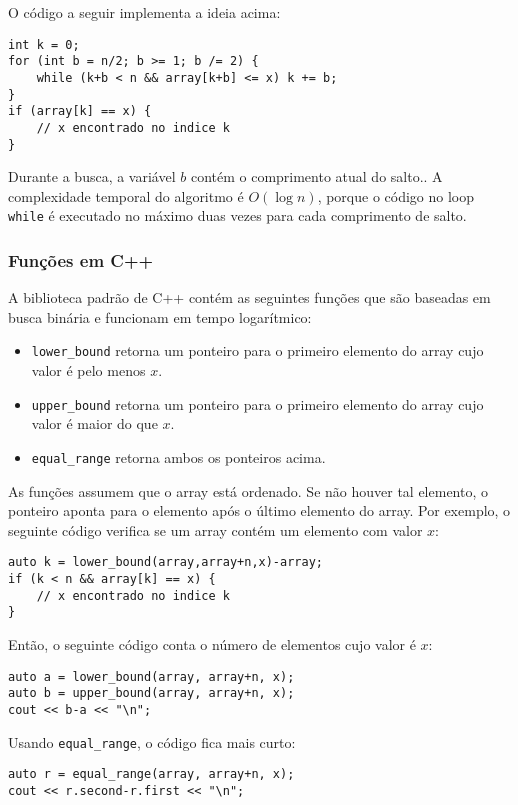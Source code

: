 O código a seguir implementa a ideia acima:
\begin{lstlisting}
int k = 0;
for (int b = n/2; b >= 1; b /= 2) {
    while (k+b < n && array[k+b] <= x) k += b;
}
if (array[k] == x) {
    // x encontrado no indice k
}
\end{lstlisting}

Durante a busca, a variável $b$
contém o comprimento atual do salto..
A complexidade temporal do algoritmo é $O(\log n)$,
porque o código no loop \texttt{while}
é executado no máximo duas vezes para cada comprimento de salto.

\subsubsection{Funções em C++}

A biblioteca padrão de C++ contém as seguintes funções que são baseadas em busca binária e funcionam em tempo logarítmico:

\begin{itemize}
\item \texttt{lower\_bound} retorna um ponteiro para o primeiro elemento do array cujo valor é pelo menos $x$.
\item \texttt{upper\_bound} retorna um ponteiro para o primeiro elemento do array cujo valor é maior do que $x$.
\item \texttt{equal\_range} retorna ambos os ponteiros acima.
\end{itemize}

As funções assumem que o array está ordenado. Se não houver tal elemento, o ponteiro aponta para o elemento após o último elemento do array. Por exemplo, o seguinte código verifica se um array contém um elemento com valor $x$:

\begin{lstlisting}
auto k = lower_bound(array,array+n,x)-array;
if (k < n && array[k] == x) {
    // x encontrado no indice k
}
\end{lstlisting}

Então, o seguinte código conta o número de elementos cujo valor é $x$:

\begin{lstlisting}
auto a = lower_bound(array, array+n, x);
auto b = upper_bound(array, array+n, x);
cout << b-a << "\n";
\end{lstlisting}

Usando \texttt{equal\_range}, o código fica mais curto:

\begin{lstlisting}
auto r = equal_range(array, array+n, x);
cout << r.second-r.first << "\n";
\end{lstlisting}

